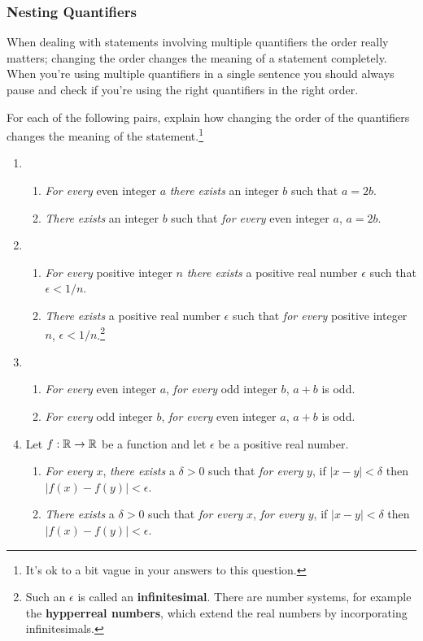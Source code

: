 \subsubsection{Nesting Quantifiers}
	When dealing with statements involving multiple quantifiers the order really matters; changing the order changes the meaning of a statement completely. When you're using multiple quantifiers in a single sentence you should always pause and check if you're using the right quantifiers in the right order.

\begin{exercise}
	For each of the following pairs, explain how changing the order of the quantifiers changes the meaning of the statement.\footnote{It's ok to a bit vague in your answers to this question.}
	\begin{enumerate}
		\item \begin{enumerate}
			\item \emph{For every} even integer $a$ \emph{there exists} an integer $b$ such that $a = 2b$.
			\item \emph{There exists} an integer $b$ such that \emph{for every} even integer $a$, $a = 2b$.
		\end{enumerate}
		\item \begin{enumerate}
			\item \emph{For every} positive integer $n$ \emph{there exists} a positive real number $\epsilon$ such that $ \epsilon < 1/n$.
			\item \emph{There exists} a positive real number $\epsilon$ such that \emph{for every} positive integer $n$, $ \epsilon < 1/n$.\footnote{Such an $\epsilon$ is called an {\bf infinitesimal}.	There are number systems, for example the \textbf{hypperreal numbers}, which extend the real numbers by incorporating infinitesimals.}
		\end{enumerate}
		\item \begin{enumerate}
			\item \emph{For every} even integer $a$, \emph{for every} odd integer $b$, $a + b$ is odd.
			\item \emph{For every} odd integer $b$, \emph{for every} even integer $a$, $a + b$ is odd.
			\end{enumerate}
		\item Let $f: \mathbb{R} \rightarrow \mathbb{R}$ be a function and let $\epsilon$ be a positive real number. \begin{enumerate}
			\item {\it For every} $x$, {\it there exists} a $\delta > 0$ such that {\it for every} $y$, if $|x-y| < \delta$ then $|f(x) - f(y)| < \epsilon$.
			\item {\it There exists} a $\delta > 0$ such that {\it for every} $x$, {\it for every} $y$, if $|x-y| < \delta$ then $|f(x) - f(y)| < \epsilon$.
		\end{enumerate}
	\end{enumerate}
\end{exercise}

